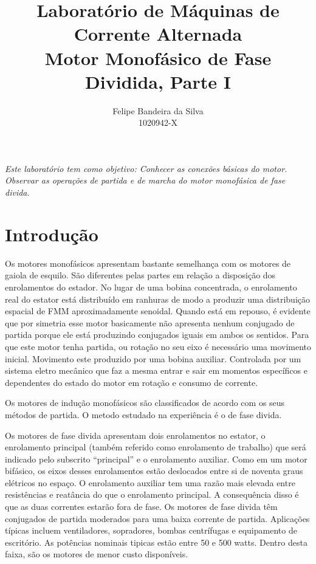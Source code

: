 \documentclass[paper=a4, fontsize=11pt]{article}
\title{Laboratório de Máquinas de Corrente Alternada\\Motor Monofásico de Fase Dividida, Parte I}
\author{Felipe Bandeira da Silva\\1020942-X}
\begin{document}
\maketitle


\textit{Este laboratório tem como objetivo: Conhecer as conexões básicas do motor.
Observar as operações de partida e de marcha do motor monofásica de fase divida.}

\newpage

\tableofcontents

\newpage



\newpage
\section{Introdução}

Os motores monofásicos apresentam bastante semelhança com os motores
de gaiola de esquilo. São diferentes pelas partes em relação a 
disposição dos enrolamentos do estador. No lugar de uma bobina
concentrada, o enrolamento real do estator está distribuído em 
ranhuras de modo a produzir uma distribuição espacial de FMM 
aproximadamente senoidal. Quando está em repouso, é evidente que
por simetria esse motor basicamente não apresenta nenhum conjugado
de partida porque ele está produzindo conjugados iguais em ambos
os sentidos. Para que este motor tenha partida, ou rotação no seu
eixo é necessário uma movimento inicial. Movimento este produzido
por uma bobina auxiliar. Controlada por um sistema eletro mecânico
que faz a mesma entrar e sair em momentos específicos e dependentes
do estado do motor em rotação e consumo de corrente.

Os motores de indução monofásicos são classificados de acordo 
com os seus métodos de partida. O metodo estudado na experiência
é o de fase divida. 

Os motores de fase divida apresentam dois enrolamentos no estator, 
o enrolamento principal (também referido como enrolamento de trabalho)
que será indicado pelo subscrito ``principal'' e o enrolamento auxiliar.
Como em um motor bifásico, os eixos desses enrolamentos estão deslocados
entre si de noventa graus elétricos no espaço. O enrolamento auxiliar
tem uma razão mais elevada entre resistências e reatância do que 
o enrolamento principal. A consequência disso é que as duas correntes
estarão fora de fase. Os motores de fase divida têm conjugados de partida
moderados para uma baixa corrente de partida. Aplicações típicas incluem
ventiladores, sopradores, bombas centrífugas e equipamento de escritório. 
As potências nominais tipicas estão entre 50 e 500 watts. Dentro desta
faixa, são os motores de menor custo disponíveis.
\end{document}
